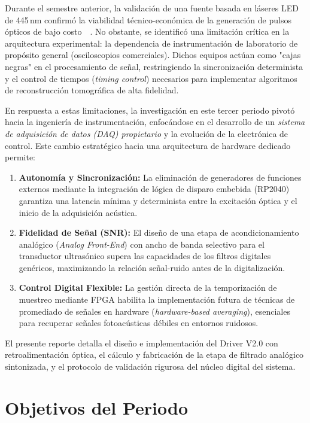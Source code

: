 \documentclass[12pt,letterpaper]{article}
\begin{document}
Durante el semestre anterior, la validación de una fuente basada en láseres LED de 445\,nm confirmó la viabilidad técnico-económica de la generación de pulsos ópticos de bajo costo~\cite{wu_advanced_2021}~\cite{li_photoacoustic_2020}. No obstante, se identificó una limitación crítica en la arquitectura experimental: la dependencia de instrumentación de laboratorio de propósito general (osciloscopios comerciales). Dichos equipos actúan como "cajas negras" en el procesamiento de señal, restringiendo la sincronización determinista y el control de tiempos (\textit{timing control}) necesarios para implementar algoritmos de reconstrucción tomográfica de alta fidelidad.

En respuesta a estas limitaciones, la investigación en este tercer periodo pivotó hacia la ingeniería de instrumentación, enfocándose en el desarrollo de un \textit{sistema de adquisición de datos (DAQ) propietario} y la evolución de la electrónica de control. Este cambio estratégico hacia una arquitectura de hardware dedicado permite:

\begin{enumerate}
    \item \textbf{Autonomía y Sincronización:} La eliminación de generadores de funciones externos mediante la integración de lógica de disparo embebida (RP2040) garantiza una latencia mínima y determinista entre la excitación óptica y el inicio de la adquisición acústica.
    \item \textbf{Fidelidad de Señal (SNR):} El diseño de una etapa de acondicionamiento analógico (\textit{Analog Front-End}) con ancho de banda selectivo para el transductor ultrasónico supera las capacidades de los filtros digitales genéricos, maximizando la relación señal-ruido antes de la digitalización.
    \item \textbf{Control Digital Flexible:} La gestión directa de la temporización de muestreo mediante FPGA habilita la implementación futura de técnicas de promediado de señales en hardware (\textit{hardware-based averaging}), esenciales para recuperar señales fotoacústicas débiles en entornos ruidosos.
\end{enumerate}

El presente reporte detalla el diseño e implementación del Driver V2.0 con retroalimentación óptica, el cálculo y fabricación de la etapa de filtrado analógico sintonizada, y el protocolo de validación rigurosa del núcleo digital del sistema.

\section{Objetivos del Periodo}
\end{document}
